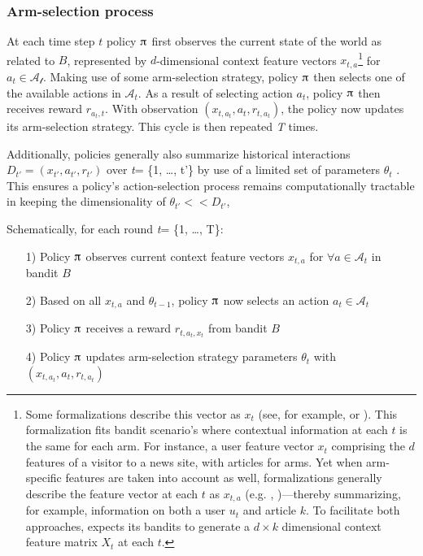 \documentclass{jss}
\begin{document}
\subsubsection{Arm-selection process} \label{formalization}

At each time step $t$ policy $\piup$ first observes the current state of the world as related to $B$, represented by $d$-dimensional context feature vectors \(x_{t,a}\)\footnote{Some formalizations describe this vector as $x_t$ (see, for example, \cite{Slivkins2014} or \cite{May2012}). This formalization fits bandit scenario's where contextual information at each $t$ is the same for each arm. For instance, a user feature vector $x_t$ comprising the $d$ features of a visitor to a news site, with articles for arms. Yet when arm-specific features are taken into account as well, formalizations generally describe the feature vector at each $t$ as $x_{t,a}$ (e.g. \cite{Chu2009}, \cite{Li2010})---thereby summarizing, for example, information on both a user $u_t$ and article $k$. To facilitate both approaches,  expects its bandits to generate a $d \times k$ dimensional context feature matrix $X_t$ at each $t$.} for \(a_{t} \in \mathcal{A_t}\). Making use of some arm-selection strategy, policy $\piup$ then selects one of the available actions in $\mathcal{A}_t$. As a result of selecting action $a_t$, policy $\piup$ then receives reward \(r_{a_{t},t}\). With observation \( (x_{t,a_t},a_{t},r_{t,a_t}) \), the policy now updates its arm-selection strategy. This cycle is then repeated \textit{T} times.

Additionally, policies generally also summarize historical interactions \( D_{t'} = (x_{t'},a_{t'},r_{t'}) \) over \emph{t}= \{1, \ldots, t'\} by use of a limited set of parameters $\theta_{t}$ \citep{kruijswijk2018streamingbandit}. This ensures a policy's action-selection process remains computationally tractable in keeping the dimensionality of $\theta_{t'} << D_{t'}$,

Schematically, for each round \emph{t}= \{1, \ldots, T\}:

\begin{enumerate}
         \item[1)] Policy $\piup$ observes current context feature vectors $x_{t,a}$ for $\forall a \in \mathcal{A}_t$ in bandit $B$
         \item[2)] Based on all $x_{t,a}$ and $\theta_{t-1}$, policy $\piup$ now selects an action \(a_{t} \in \mathcal{A}_t\)
         \item[3)] Policy $\piup$ receives a reward \(r_{t,a_t,x_t}\) from bandit $B$
         \item[4)] Policy $\piup$ updates arm-selection strategy parameters $\theta_{t}$ with \( (x_{t,a_t},a_t,r_{t,a_t}) \)
\end{enumerate}
\end{document}
